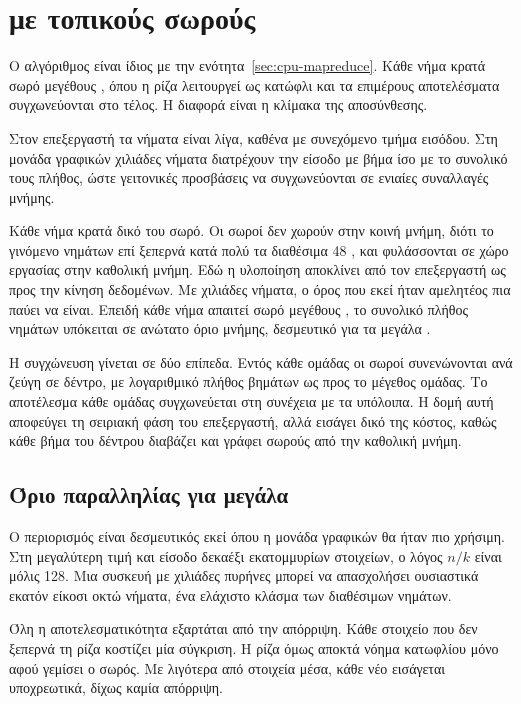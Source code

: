 \section{ με τοπικούς σωρούς}
\label{sec:gpu-mapreduce}

Ο αλγόριθμος είναι ίδιος με την ενότητα~\ref{sec:cpu-mapreduce}. Κάθε νήμα
κρατά σωρό μεγέθους , όπου η ρίζα λειτουργεί ως κατώφλι και τα επιμέρους
αποτελέσματα συγχωνεύονται στο τέλος. Η διαφορά είναι η κλίμακα της
αποσύνθεσης.

Στον επεξεργαστή τα νήματα είναι λίγα, καθένα με συνεχόμενο τμήμα εισόδου. Στη
μονάδα γραφικών χιλιάδες νήματα διατρέχουν την είσοδο με βήμα ίσο με το
συνολικό τους πλήθος, ώστε γειτονικές προσβάσεις να συγχωνεύονται σε ενιαίες
συναλλαγές μνήμης.

Κάθε νήμα κρατά δικό του σωρό. Οι σωροί δεν χωρούν στην κοινή μνήμη, διότι το
γινόμενο νημάτων επί  ξεπερνά κατά πολύ τα διαθέσιμα 48 , και
φυλάσσονται σε χώρο εργασίας στην καθολική μνήμη. Εδώ η υλοποίηση αποκλίνει από
τον επεξεργαστή ως προς την κίνηση δεδομένων. Με χιλιάδες νήματα, ο όρος που
εκεί ήταν αμελητέος πια παύει να είναι. Επειδή κάθε νήμα απαιτεί σωρό μεγέθους
, το συνολικό πλήθος νημάτων υπόκειται σε ανώτατο όριο μνήμης, δεσμευτικό
για τα μεγάλα .

Η συγχώνευση γίνεται σε δύο επίπεδα. Εντός κάθε ομάδας οι σωροί συνενώνονται
ανά ζεύγη σε δέντρο, με λογαριθμικό πλήθος βημάτων ως προς το μέγεθος ομάδας.
Το αποτέλεσμα κάθε ομάδας συγχωνεύεται στη συνέχεια με τα υπόλοιπα. Η δομή αυτή
αποφεύγει τη σειριακή φάση του επεξεργαστή, αλλά εισάγει δικό της κόστος, καθώς
κάθε βήμα του δέντρου διαβάζει και γράφει σωρούς από την καθολική μνήμη.

\subsection{Όριο παραλληλίας για μεγάλα }
\label{sec:gpu-mapreduce-limit}

Ο περιορισμός είναι δεσμευτικός εκεί όπου η μονάδα γραφικών θα ήταν πιο
χρήσιμη. Στη μεγαλύτερη τιμή  και είσοδο δεκαέξι εκατομμυρίων στοιχείων,
ο λόγος $n/k$ είναι μόλις 128. Μια συσκευή με χιλιάδες πυρήνες μπορεί να
απασχολήσει ουσιαστικά εκατόν είκοσι οκτώ νήματα, ένα ελάχιστο κλάσμα των
διαθέσιμων νημάτων.

Όλη η αποτελεσματικότητα εξαρτάται από την απόρριψη. Κάθε στοιχείο που δεν
ξεπερνά τη ρίζα κοστίζει μία σύγκριση. Η ρίζα όμως αποκτά νόημα κατωφλίου μόνο
αφού γεμίσει ο σωρός. Με λιγότερα από  στοιχεία μέσα, κάθε νέο εισάγεται
υποχρεωτικά, δίχως καμία απόρριψη.

